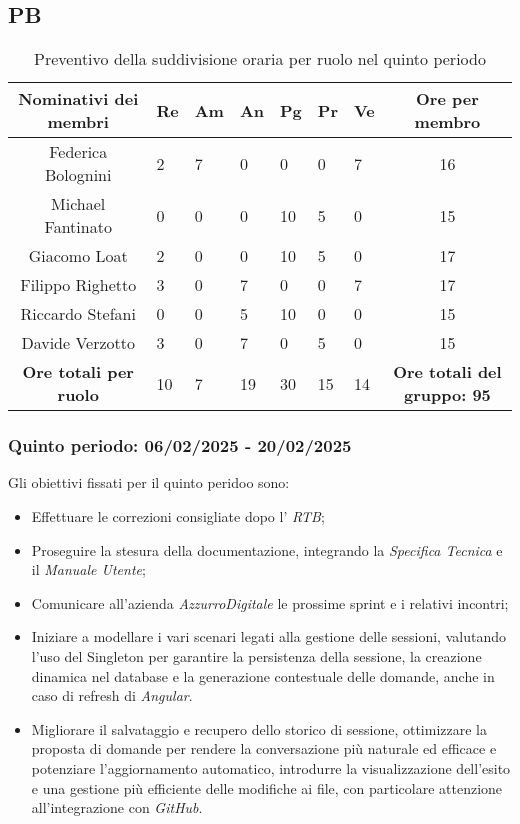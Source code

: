 \newpage
\subsection{PB}
\begin{table}[h!]
    \centering
    \renewcommand{\arraystretch}{1.5}
    \begin{tabularx}{\textwidth}{|c|X|X|X|X|X|X|c|}\hline
    \rowcolor[HTML]{FFD700} 
    \textbf{Nominativi dei membri} & \textbf{Re} & \textbf{Am} & \textbf{An} & \textbf{Pg} & \textbf{Pr} & \textbf{Ve} & \textbf{Ore per membro} \\ \hline
    Federica Bolognini  & 2 & 7 & 0 & 0 & 0 & 7 & 16 \\ \hline
    Michael Fantinato   & 0 & 0 & 0 & 10 & 5 & 0 & 15  \\ \hline
    Giacomo Loat        & 2 & 0 & 0 & 10 & 5 & 0 & 17  \\ \hline
    Filippo Righetto    & 3 & 0 & 7 & 0 & 0 & 7 & 17 \\ \hline
    Riccardo Stefani    & 0 & 0 & 5 & 10 & 0 & 0 & 15 \\ \hline
    Davide Verzotto     & 3 & 0 & 7 & 0 & 5 & 0 & 15  \\ \hline
    \rowcolor[HTML]{FFD700} 
    \textbf{Ore totali per ruolo} & 10 & 7 & 19 & 30 & 15 & 14 & \textbf{Ore totali del gruppo: 95} \\ \hline
    \end{tabularx}
    \caption{Preventivo della suddivisione oraria per ruolo nel quinto periodo}
\end{table}

\subsubsection{Quinto periodo: 06/02/2025 - 20/02/2025}
\label{sec:prev_cons_quinto_periodo}  
Gli obiettivi fissati per il quinto peridoo sono:
\begin{itemize}
    \item Effettuare le correzioni consigliate dopo l' \emph{RTB};
    \item Proseguire la stesura della documentazione, integrando la \emph{Specifica Tecnica} e il \emph{Manuale Utente};
    \item Comunicare all'azienda \emph{AzzurroDigitale} le prossime sprint e i relativi incontri;
    \item Iniziare a modellare i vari scenari legati alla gestione delle sessioni, valutando l’uso del Singleton per garantire la persistenza della sessione, la creazione dinamica nel database e la generazione contestuale delle domande, anche in caso di refresh di \emph{Angular}.
    \item Migliorare il salvataggio e recupero dello storico di sessione, ottimizzare la proposta di domande per rendere la conversazione più naturale ed efficace e potenziare l’aggiornamento automatico, introdurre la visualizzazione dell’esito e una gestione più efficiente delle modifiche ai file, con particolare attenzione all’integrazione con \emph{GitHub}.
\end{itemize}


